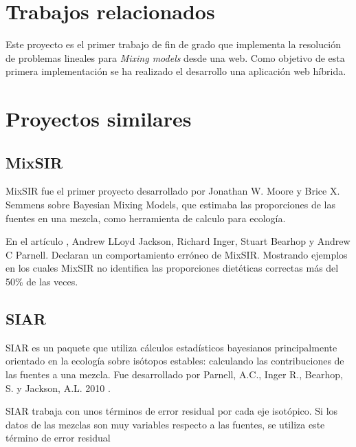 

\section{Trabajos relacionados}
Este proyecto es el primer trabajo de fin de grado que implementa la resolución de problemas lineales para \emph{Mixing models} desde una web. Como objetivo de esta primera implementación se ha realizado el desarrollo una aplicación web híbrida.

\section{Proyectos similares}

\subsection{MixSIR} 

MixSIR fue el primer proyecto desarrollado por Jonathan W. Moore y Brice X. Semmens sobre Bayesian Mixing Models, que estimaba las proporciones de las fuentes en una mezcla, como herramienta de calculo para ecología.

En el artículo \cite{errorofMixSIR}, Andrew LLoyd Jackson, Richard Inger, Stuart Bearhop y Andrew C Parnell. Declaran un comportamiento erróneo de MixSIR. Mostrando ejemplos en los cuales MixSIR no identifica las proporciones dietéticas correctas más del 50\% de las veces.


\subsection{SIAR} 
SIAR es un paquete que utiliza cálculos estadísticos bayesianos principalmente orientado en la ecología sobre isótopos estables: calculando las contribuciones de las fuentes a una mezcla. Fue desarrollado por Parnell, A.C., Inger R., Bearhop, S. y Jackson, A.L. 2010 \cite{SIAR:Package}.

SIAR trabaja con unos términos de error residual por cada eje isotópico. Si los datos de las mezclas son muy variables respecto a las fuentes, se utiliza este término de error residual

